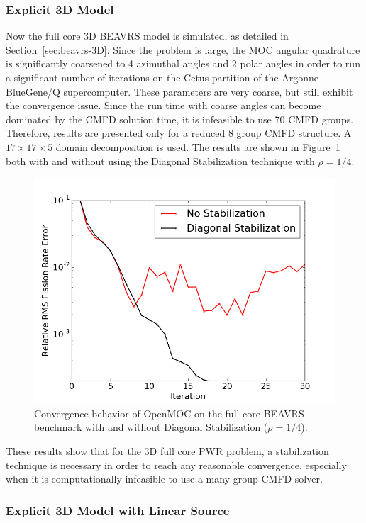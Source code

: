 \subsubsection{Explicit 3D Model}

Now the full core 3D BEAVRS model is simulated, as detailed in Section~\ref{sec:beavrs-3D}. Since the problem is large, the \ac{MOC} angular quadrature is significantly coarsened to 4 azimuthal angles and 2 polar angles in order to run a significant number of iterations on the Cetus partition of the Argonne BlueGene/Q supercomputer. These parameters are very coarse, but still exhibit the convergence issue. Since the run time with coarse angles can become dominated by the \ac{CMFD} solution time, it is infeasible to use 70 \ac{CMFD} groups. Therefore, results are presented only for a reduced 8 group \ac{CMFD} structure. A $17 \times 17 \times 5$ domain decomposition is used. The results are shown in Figure~\ref{fig:fc-3D} both with and without using the Diagonal Stabilization technique with $\rho = 1/4$. 

\begin{figure}[ht!]
	\centering
	\includegraphics[width=0.65\linewidth]{figures/convergence/full-core-3D.png}
	\caption{Convergence behavior of OpenMOC on the full core \ac{BEAVRS} benchmark with and without Diagonal Stabilization ($\rho = 1/4$).}
	\label{fig:fc-3D}
\end{figure}

These results show that for the 3D full core \ac{PWR} problem, a stabilization technique is necessary in order to reach any reasonable convergence, especially when it is computationally infeasible to use a many-group \ac{CMFD} solver.

\subsubsection{Explicit 3D Model with Linear Source}

